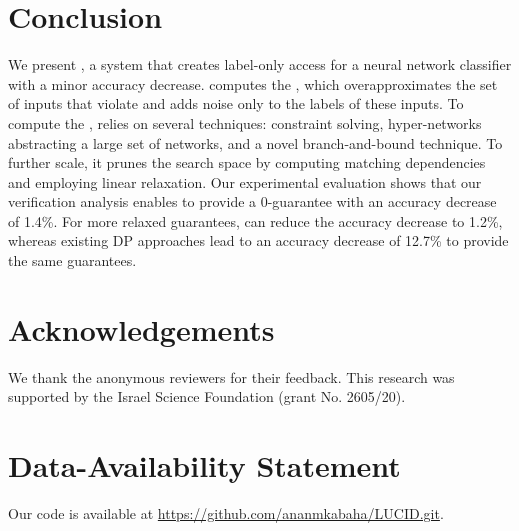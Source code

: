 \section{Conclusion}
\label{sec:conclusions_and_discussion}
We present \tool, a system that creates \propi label-only access for a neural network classifier with a minor accuracy decrease.   
\tool computes the \propa, which overapproximates the set of inputs that violate \propi %
and adds noise only to the labels of these inputs. %
To compute the \propa, \tool 
relies on several techniques: constraint solving, hyper-networks abstracting a large set of networks, and a novel branch-and-bound technique. %
To further scale, it prunes the search space by
computing matching dependencies %
and employing linear relaxation. %
Our experimental evaluation shows that our verification analysis enables \tool to provide a $0$-\propi guarantee with an accuracy decrease of 1.4\%. For more relaxed \propi guarantees, \tool can reduce the accuracy decrease to 1.2\%, whereas existing DP approaches lead to an accuracy decrease of 12.7\% to provide the same \propi guarantees. %
\section*{Acknowledgements} We thank the anonymous reviewers for their feedback. This research was supported by the Israel Science Foundation (grant No. 2605/20). 

\section*{Data-Availability Statement}
Our code is available at \url{https://github.com/ananmkabaha/LUCID.git}. 
